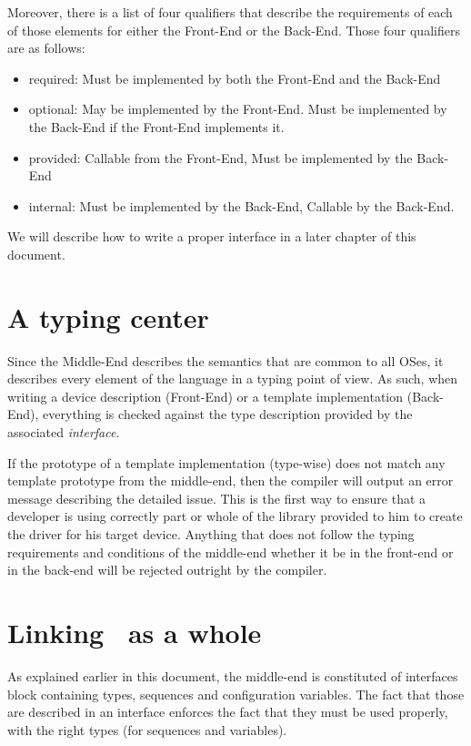 \documentclass[american]{rtxreport}
\begin{document}
Moreover, there is a list of four qualifiers that describe the requirements of
each of those elements for either the Front-End or the Back-End. Those four
qualifiers are as follows:
\begin{itemize}
    \item required: Must be implemented by both the Front-End and the Back-End
    \item optional: May be implemented by the Front-End. Must be implemented
            by the Back-End if the Front-End implements it.
    \item provided: Callable from the Front-End, Must be implemented by the
            Back-End
    \item internal: Must be implemented by the Back-End, Callable by the
            Back-End.
\end{itemize}

We will describe how to write a proper interface in a later chapter of this
document.


\section{A typing center}

Since the Middle-End describes the semantics that are common to all OSes, it
describes every element of the language in a typing point of view. As such,
when writing a device description (Front-End) or a template implementation
(Back-End), everything is checked against the type description provided by
the associated \emph{interface}.

If the prototype of a template implementation (type-wise) does not match any
template prototype from the middle-end, then the compiler will output an error
message describing the detailed issue. This is the first way to ensure that
a developer is using correctly part or whole of the library provided to him
to create the driver for his target device. Anything that does not follow the
typing requirements and conditions of the middle-end whether it be in the
front-end or in the back-end will be rejected outright by the compiler.


\section{Linking \rtx\ as a whole}

As explained earlier in this document, the middle-end is constituted of
interfaces block containing types, sequences and configuration variables.
The fact that those are described in an interface enforces the fact that
they must be used properly, with the right types (for sequences and variables).
\end{document}
